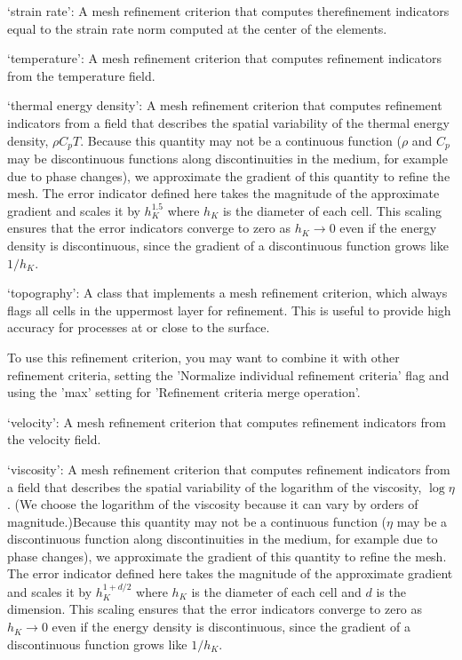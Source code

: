 \begin{itemize}
`strain rate': A mesh refinement criterion that computes therefinement indicators equal to the strain rate norm computed at the center of the elements.

`temperature': A mesh refinement criterion that computes refinement indicators from the temperature field.

`thermal energy density': A mesh refinement criterion that computes refinement indicators from a field that describes the spatial variability of the thermal energy density, $\rho C_p T$. Because this quantity may not be a continuous function ($\rho$ and $C_p$ may be discontinuous functions along discontinuities in the medium, for example due to phase changes), we approximate the gradient of this quantity to refine the mesh. The error indicator defined here takes the magnitude of the approximate gradient and scales it by $h_K^{1.5}$ where $h_K$ is the diameter of each cell. This scaling ensures that the error indicators converge to zero as $h_K\rightarrow 0$ even if the energy density is discontinuous, since the gradient of a discontinuous function grows like $1/h_K$.

`topography': A class that implements a mesh refinement criterion, which always flags all cells in the uppermost layer for refinement. This is useful to provide high accuracy for processes at or close to the surface.

To use this refinement criterion, you may want to combine it with other refinement criteria, setting the 'Normalize individual refinement criteria' flag and using the 'max' setting for 'Refinement criteria merge operation'.

`velocity': A mesh refinement criterion that computes refinement indicators from the velocity field.

`viscosity': A mesh refinement criterion that computes refinement indicators from a field that describes the spatial variability of the logarithm of the viscosity, $\log\eta$. (We choose the logarithm of the viscosity because it can vary by orders of magnitude.)Because this quantity may not be a continuous function ($\eta$ may be a discontinuous function along discontinuities in the medium, for example due to phase changes), we approximate the gradient of this quantity to refine the mesh. The error indicator defined here takes the magnitude of the approximate gradient and scales it by $h_K^{1+d/2}$ where $h_K$ is the diameter of each cell and $d$ is the dimension. This scaling ensures that the error indicators converge to zero as $h_K\rightarrow 0$ even if the energy density is discontinuous, since the gradient of a discontinuous function grows like $1/h_K$.



\end{itemize}
